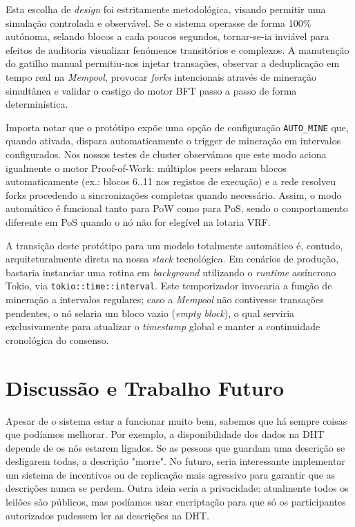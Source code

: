 \documentclass[11pt]{article}
\begin{document}
    Esta escolha de \textit{design} foi estritamente metodológica, visando permitir uma simulação controlada e observável. Se o sistema operasse de forma 100\% autónoma, selando blocos a cada poucos segundos, tornar-se-ia inviável para efeitos de auditoria visualizar fenómenos transitórios e complexos. A manutenção do gatilho manual permitiu-nos injetar transações, observar a deduplicação em tempo real na \textit{Mempool}, provocar \textit{forks} intencionais através de mineração simultânea e validar o castigo do motor BFT passo a passo de forma determinística.

    Importa notar que o protótipo expõe uma opção de configuração 
    \texttt{AUTO\_MINE} que, quando ativada, dispara automaticamente o trigger de mineração em intervalos configurados. Nos nossos testes de cluster observámos que este modo aciona igualmente o motor Proof-of-Work: múltiplos peers selaram blocos automaticamente (ex.: blocos 6..11 nos registos de execução) e a rede resolveu forks procedendo a sincronizações completas quando necessário. Assim, o modo automático é funcional tanto para PoW como para PoS, sendo o comportamento diferente em PoS quando o nó não for elegível na lotaria VRF.

A transição deste protótipo para um modelo totalmente automático é, contudo, arquiteturalmente direta na nossa \textit{stack} tecnológica. Em cenários de produção, bastaria instanciar uma rotina em \textit{background} utilizando o \textit{runtime} assíncrono Tokio, via \texttt{tokio::time::interval}. Este temporizador invocaria a função de mineração a intervalos regulares; caso a \textit{Mempool} não contivesse transações pendentes, o nó selaria um bloco vazio (\textit{empty block}), o qual serviria exclusivamente para atualizar o \textit{timestamp} global e manter a continuidade cronológica do consenso.

\section{Discussão e Trabalho Futuro}

Apesar de o sistema estar a funcionar muito bem, sabemos que há sempre coisas que podíamos melhorar. Por exemplo, a disponibilidade dos dados na DHT depende de os nós estarem ligados. Se as pessoas que guardam uma descrição se desligarem todas, a descrição "morre". No futuro, seria interessante implementar um sistema de incentivos ou de replicação mais agressivo para garantir que as descrições nunca se perdem. Outra ideia seria a privacidade: atualmente todos os leilões são públicos, mas podíamos usar encriptação para que só os participantes autorizados pudessem ler as descrições na DHT.
\end{document}
